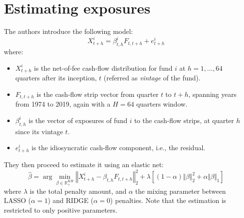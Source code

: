 \documentclass[12pt]{article}
\begin{document}
\section{Estimating exposures}\label{sec:estimating-exposures}
    The authors introduce the following model:
    \begin{equation}
        X_{t+h}^i = \beta^i_{t,h} F_{t,t+h} +e^i_{t+h}
        \label{eq:exposures}
    \end{equation}
    where:
    \begin{itemize}
        \item $X_{t+h}^i$ is the net-of-fee cash-flow distribution for fund $i$ at $h=1,\hdots, 64$ quarters after its inception, $t$ (referred as \textit{vintage} of the fund).
        \item $F_{t,t+h}$ is the cash-flow strip vector from quarter $t$ to $t+h$, spanning years from 1974 to 2019, again with a $H=64$ quarters window.
        \item $\beta^i_{t,h}$ is the vector of exposures of fund $i$ to the cash-flow strips, at quarter $h$ since its vintage $t$.
        \item $e^i_{t+h}$ is the idiosyncratic cash-flow component, i.e., the residual.
    \end{itemize}
    They then proceed to estimate it using an elastic net:
    \begin{equation}
        \hat \beta = \arg \min _{\beta \in \mathbb R^{KH}_+} \left \Vert X_{t+h}^i - \beta_{t,h} F_{t,t+h} \right \Vert_2^2 + \lambda \left[(1-\alpha)\Vert \beta \Vert_2^2 + \alpha \Vert \beta \Vert_1\right]
        \label{eq:elastic-net}
    \end{equation}
    where $\lambda$ is the total penalty amount, and $\alpha$ the mixing parameter between LASSO ($\alpha =1$) and RIDGE ($\alpha =0$) penalties.
    Note that the estimation is restricted to only positive parameters.
\end{document}
